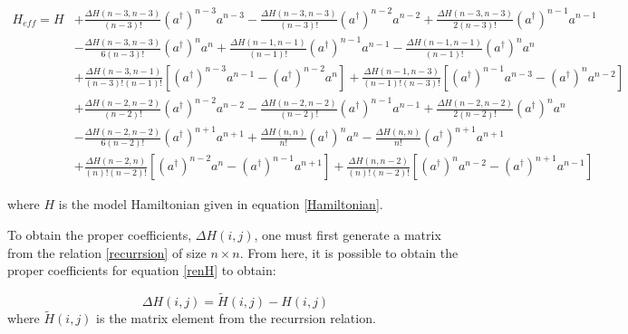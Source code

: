 \documentclass[%
 reprint,
nofootinbib,
 amsmath,amssymb,
 aps,
]{revtex4-2}
\numberwithin{equation}{section}
\begin{document}
\begin{widetext}
\begin{align}
  \label{renH}
  H_{eff} = H &+ \frac{\Delta H(n-3, n-3)}{(n-3)!}(a^\dagger)^{n-3}a^{n-3} - \frac{\Delta H(n-3, n-3)}{(n-3)!}(a^\dagger)^{n-2}a^{n-2} + \frac{\Delta H(n-3, n-3)}{2(n-3)!}(a^\dagger)^{n-1}a^{n-1}\\ \nonumber
             &- \frac{\Delta H(n-3, n-3)}{6(n-3)!}(a^\dagger)^{n}a^{n} +  \frac{\Delta H(n-1, n-1)}{(n-1)!}(a^\dagger)^{n - 1}a^{n - 1} - \frac{\Delta H(n-1, n-1)}{(n-1)!}(a^\dagger)^{n}a^{n}\\ \nonumber
             &+ \frac{\Delta H(n-3, n-1)}{(n-3)!(n-1)!}\left[(a^\dagger)^{n-3}a^{n-1} - (a^\dagger)^{n-2}a^{n} \right]+ \frac{\Delta H(n-1, n-3)}{(n-1)!(n-3)!}\left[(a^\dagger)^{n-1}a^{n-3} - (a^\dagger)^{n}a^{n-2} \right] \\ \nonumber
             &+ \frac{\Delta H(n-2, n-2)}{(n-2)!}(a^\dagger)^{n-2}a^{n-2} - \frac{\Delta H(n-2, n-2)}{(n-2)!}(a^\dagger)^{n-1}a^{n-1} + \frac{\Delta H(n-2, n-2)}{2(n-2)!}(a^\dagger)^{n}a^{n} \\ \nonumber
             &-\frac{\Delta H(n-2, n-2)}{6(n-2)!}(a^\dagger)^{n+1}a^{n+1} + \frac{\Delta H(n, n)}{n!}(a^\dagger)^n a^n -\frac{\Delta H(n, n)}{n!}(a^\dagger)^{n + 1} a^{n + 1} \\ \nonumber
             &+ \frac{\Delta H(n-2, n)}{(n)!(n-2)!}\left[(a^\dagger)^{n-2}a^{n} - (a^\dagger)^{n-1}a^{n+1} \right]+ \frac{\Delta H(n, n-2)}{(n)!(n-2)!}\left[(a^\dagger)^{n}a^{n-2} - (a^\dagger)^{n+1}a^{n-1} \right]
\end{align}
\end{widetext}
where $H$ is the model Hamiltonian given in equation \ref{Hamiltonian}.

To obtain the proper coefficients, $\Delta H(i,j)$, one must first generate a matrix from the relation \ref{recurrsion} of size $n \times n$. From here, it is possible to obtain the proper coefficients for equation \ref{renH} to obtain:

\begin{equation}
  \Delta H(i, j) = \tilde{H}(i,j) - H(i,j)
\end{equation}
where $\tilde{H}(i,j)$ is the matrix element from the recurrsion relation.
\end{document}
